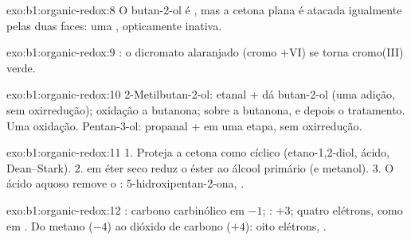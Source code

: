 \begin{solution}{exo:b1:organic-redox:8}
O butan-2-ol é , mas a cetona plana é atacada igualmente pelas duas
faces: uma , opticamente inativa.
\end{solution}

\begin{solution}{exo:b1:organic-redox:9}
: o dicromato
alaranjado (cromo $+$VI) se torna cromo(III) verde.
\end{solution}

\begin{solution}{exo:b1:organic-redox:10}
2-Metilbutan-2-ol: etanal +  dá butan-2-ol (uma adição,
sem oxirredução); oxidação a butanona;  sobre a butanona, e
depois o tratamento. Uma oxidação. Pentan-3-ol: propanal + 
em uma etapa, sem oxirredução.
\end{solution}

\begin{solution}{exo:b1:organic-redox:11}
1. Proteja a cetona como  cíclico (etano-1,2-diol, ácido,
Dean--Stark). 2.  em éter seco reduz o éster ao álcool primário
(e metanol). 3. O ácido aquoso remove o :
5-hidroxipentan-2-ona, .
\end{solution}

\begin{solution}{exo:b1:organic-redox:12}
: carbono carbinólico em $-1$; : $+3$; quatro elétrons, como em
. Do metano ($-4$) ao dióxido de
carbono ($+4$): oito elétrons, .
\end{solution}

